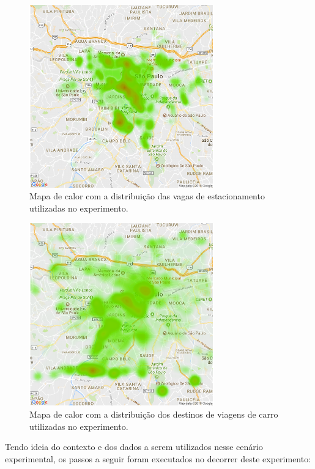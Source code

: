 \begin{figure}[!ht]
    \centering
    \includegraphics[width=8cm]{figuras/mapa_vagas.pdf}
    \caption{Mapa de calor com a distribuição das vagas de estacionamento utilizadas no experimento.}
    \label{fig:map-spots-distribution}
\end{figure}

\begin{figure}[!ht]
    \centering
    \includegraphics[width=8cm]{figuras/mapa_viagens.pdf}
    \caption{Mapa de calor com a distribuição dos destinos de viagens de carro utilizadas no experimento.}
    \label{fig:map-destinations-distribution}
\end{figure}

Tendo ideia do contexto e dos dados a serem utilizados nesse cenário experimental, os passos a seguir foram executados no decorrer deste experimento:

